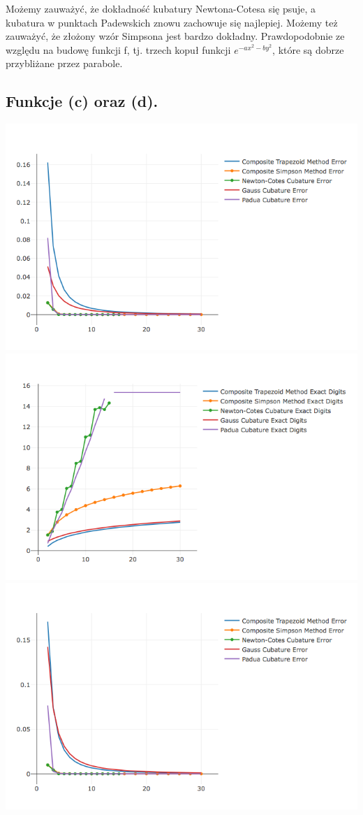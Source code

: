 \documentclass[10pt,wide]{mwart}
\theoremstyle{definition}
\begin{document}
Możemy zauważyć, że dokładność kubatury Newtona-Cotesa się psuje, a kubatura w punktach Padewskich znowu zachowuje się najlepiej.
Możemy też zauważyć, że złożony wzór Simpsona jest bardzo dokładny. Prawdopodobnie ze względu na budowę funkcji f, tj. trzech kopuł funkcji \(e^{-ax^2 - by^2}\), które są dobrze przybliżane przez parabole.


\subsection{Funkcje (c) oraz (d).}
\includegraphics[scale=0.7]{sin.png}
\includegraphics[scale=0.7]{sind.png}
\includegraphics[scale=0.7]{exp.png}
\end{document}
